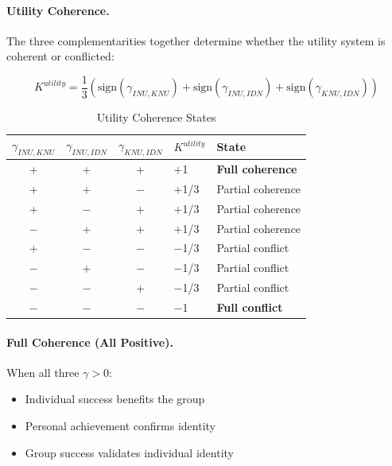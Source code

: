 \paragraph{Utility Coherence.}
The three complementarities together determine whether the utility system 
is coherent or conflicted:

\begin{tcolorbox}[colback=blue!5!white, colframe=blue!50!black, title=Definition: Utility Coherence Index]
\begin{equation}
\boxed{
K^{utility} = \frac{1}{3} \left( \text{sign}(\gamma_{INU,KNU}) + \text{sign}(\gamma_{INU,IDN}) + \text{sign}(\gamma_{KNU,IDN}) \right)
}
\label{eq:app-c-utility-coherence}
\end{equation}
\end{tcolorbox}

\begin{table}[htbp]
\centering
\caption{Utility Coherence States}
\label{tab:app-c-utility-coherence-states}
\renewcommand{\arraystretch}{1.3}
\begin{tabular}{@{}cccll@{}}
\toprule
$\gamma_{INU,KNU}$ & $\gamma_{INU,IDN}$ & $\gamma_{KNU,IDN}$ & $K^{utility}$ & \textbf{State} \\
\midrule
+ & + & + & +1 & \textbf{Full coherence} \\
+ & + & $-$ & +1/3 & Partial coherence \\
+ & $-$ & + & +1/3 & Partial coherence \\
$-$ & + & + & +1/3 & Partial coherence \\
+ & $-$ & $-$ & $-$1/3 & Partial conflict \\
$-$ & + & $-$ & $-$1/3 & Partial conflict \\
$-$ & $-$ & + & $-$1/3 & Partial conflict \\
$-$ & $-$ & $-$ & $-$1 & \textbf{Full conflict} \\
\bottomrule
\end{tabular}
\end{table}

\paragraph{Full Coherence (All Positive).}
When all three $\gamma > 0$:
\begin{itemize}
\item Individual success benefits the group
\item Personal achievement confirms identity
\item Group success validates individual identity
\end{itemize}

